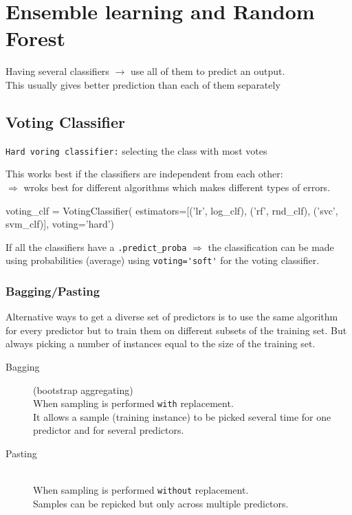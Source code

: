 \newpage

\section{Ensemble learning and Random Forest}
Having several classifiers $\rightarrow$ use all of them to predict an output.\\
This usually gives better prediction than each of them separately


\subsection{Voting Classifier}
\verb;Hard voring classifier:; selecting the class with most votes

This works best if the classifiers are independent from each other:\\
$\Rightarrow$ wroks best for different algorithms which makes different types of errors.\\

\begin{python}
    voting_clf = VotingClassifier(
        estimators=[('lr', log_clf), ('rf', rnd_clf), ('svc', svm_clf)],
        voting='hard')
\end{python}
If all the classifiers have a \verb;.predict_proba;
$\Rightarrow$ the classification can be made using probabilities (average) using
\verb;voting='soft'; for the voting classifier.\\


\subsubsection{Bagging/Pasting}
Alternative ways to get a diverse set of predictors is to use the same algorithm
for every predictor but to train them on different subsets of the training set.
But always picking a number of instances equal to the size of the training set.

\begin{description}
    \item[Bagging] (bootstrap aggregating) \hfill\\
        When sampling is performed \verb;with; replacement.\\
        It allows a sample (training instance) to be picked several time for one predictor and for several predictors.
    \item[Pasting] \hfill\\
        When sampling is performed \verb;without; replacement.\\
        Samples can be repicked but only across multiple predictors.
\end{description}

